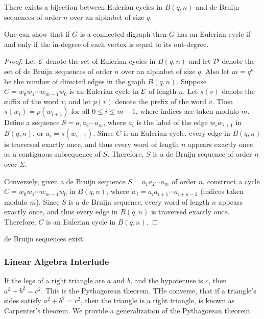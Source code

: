 \begin{theorem}
    There exists a bijection between Eulerian cycles in $B(q,n)$ and de Bruijn sequences of order $n$ over an alphabet of size $q$.
\end{theorem}

One can show that if $G$ is a connected digraph then $G$ has an Eulerian cycle if and only if the in-degree of each vertex is equal to its out-degree.

\begin{proof}
    Let $\mathcal{E}$ denote the set of Eulerian cycles in $B(q,n)$ and let $\mathcal{D}$ denote the set of de Bruijn sequences of order $n$ over an alphabet of size $q$. Also let $m = q^{n}$ be the number of directed edges in the graph $B(q,n)$. Suppose $C = w_{0}w_{1}\cdots w_{m-1}w_{0}$ is an Eulerian cycle in $\mathcal{E}$ of length $n$. Let $s(v)$ denote the suffix of the word $v$, and let $p(v)$ denote the prefix of the word $v$. Then $s(w_{i}) = p(w_{i+1})$ for all $0 \leq i \leq m-1$, where indices are taken modulo $m$. Define a sequence $S = a_{1}a_{2}\cdots a_{m}$, where $a_{i}$ is the label of the edge $w_{i}w_{i+1}$ in $B(q,n)$, or $a_{i} = s(w_{i+1})$. Since $C$ is an Eulerian cycle, every edge in $B(q,n)$ is traversed exactly once, and thus every word of length $n$ appears exactly once as a contiguous subsequence of $S$. Therefore, $S$ is a de Bruijn sequence of order $n$ over $\Sigma$.

    Conversely, given a de Bruijn sequence $S = a_{1}a_{2}\cdots a_{m}$ of order $n$, construct a cycle $C = w_{0}w_{1}\cdots w_{m-1}w_{0}$ in $B(q,n)$, where $w_{i} = a_{i}a_{i+1}\cdots a_{i+n-2}$ (indices taken modulo $m$). Since $S$ is a de Bruijn sequence, every word of length $n$ appears exactly once, and thus every edge in $B(q,n)$ is traversed exactly once. Therefore, $C$ is an Eulerian cycle in $B(q,n)$.
\end{proof}

\begin{corollary}
    de Bruijn sequences exist.
\end{corollary}

\subsubsection{Linear Algebra Interlude}
If the legs of a right triangle are $a$ and $b$, and the hypotenuse is $c$, then $a^{2} + b^{2} = c^{2}$. This is the Pythagorean theorem. THe converse, that if a triangle's sides satisfy $a^{2} + b^{2} = c^{2}$, then the triangle is a right triangle, is known as Carpenter's theorem. We provide a generalization of the Pythagorean theorem.

